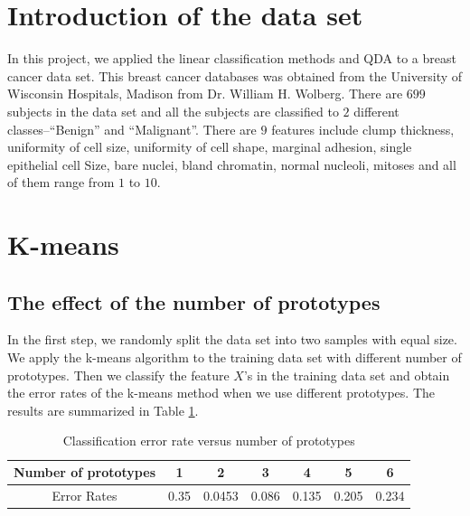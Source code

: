 \documentclass[12pt]{article}
\def\today{\ifcase\month\or
  January\or February\or March\or April\or May\or June\or
  July\or August\or September\or October\or November\or December\fi
  \space\number\day, \number\year}
\begin{document}
\renewcommand{\baselinestretch}{1.5}



\date{\today}
\section{Introduction of the data set}

In this project, we applied the linear classification methods and QDA to a breast cancer data set. This breast cancer databases was obtained from the University of Wisconsin Hospitals, Madison from Dr. William H. Wolberg.
There are $699$ subjects in the data set and all the subjects are classified to $2$ different classes--``Benign'' and ``Malignant''. There are $9$ features include clump thickness, uniformity of cell size, uniformity of cell shape, marginal adhesion, single epithelial cell Size, bare nuclei, bland chromatin, normal nucleoli, mitoses and all of them range from $1$ to $10$.



\section{K-means}
\subsection{The effect of the number of prototypes}
In the first step, we randomly split the data set into two samples with equal size. We apply the k-means algorithm to the training data set with different number of prototypes. Then we classify the feature $X$'s in the training data set and obtain the error rates of the k-means method when we use different prototypes. The results are summarized in Table \ref{tab1}.
\begin{table}[htbp]
\begin{center}
\caption{\label{tab1} Classification error rate versus number of prototypes}
\begin{tabular}{c|cccccc}
				\hline
Number of prototypes&1 &2 &3 &4&5&6 \\
				\hline
Error Rates &0.35 &0.0453 &0.086&0.135&0.205&0.234  \\
				\hline
\end{tabular}
\end{center}
\end{table}
\end{document}
